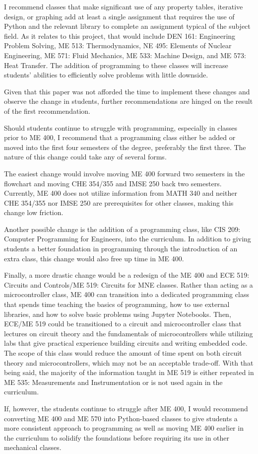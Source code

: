 I recommend classes that make significant use of any property tables, 
iterative design, or graphing add at least a single assignment that 
requires the use of Python and the relevant library to complete an assignment
typical of the subject field. As it relates to this project, that would include
DEN 161: Engineering Problem Solving, ME 513: Thermodynamics, NE 495: Elements 
of Nuclear Engineering, ME 571: Fluid Mechanics, ME 533: Machine Design, and 
ME 573: Heat Transfer. The addition of programming to these classes will 
increase students' abilities to efficiently solve problems with little downside. 

Given that this paper was not afforded the time to implement these changes
and observe the change in students, further recommendations are hinged on the
result of the first recommendation.

Should students continue to struggle with programming, especially in
classes prior to ME 400, I recommend that a programming class either be 
added or moved into the first four semesters of the degree, preferably 
the first three. The nature of this change could take any of several forms. 

The easiest change would involve moving ME 400 forward two semesters in the
flowchart and moving CHE 354/355 and IMSE 250 back two semesters. Currently,
ME 400 does not utilize information from MATH 340 and neither CHE 354/355 nor
IMSE 250 are prerequisites for other classes, making this change low friction. 

Another possible change is the addition of a programming class, like CIS 209: 
Computer Programming for Engineers, into the curriculum. In addition to 
giving students a better foundation in programming through the introduction
of an extra class, this change would also free up time in ME 400.

Finally, a more drastic change would be a redesign of the ME 400 and 
ECE 519: Circuits and Controls/ME 519: Circuits for MNE classes. Rather
than acting as a microcontroller class, ME 400 can transition into a dedicated
programming class that spends time teaching the basics of programming, how
to use external libraries, and how to solve basic problems using Jupyter
Notebooks. Then, ECE/ME 519 could be transitioned to a circuit and 
microcontroller class that lectures on circuit theory and the fundamentals
of microcontrollers while utilizing labs that give practical experience building
circuits and writing embedded code. The scope of this class would reduce
the amount of time spent on both circuit theory and microcontrollers, which
may not be an acceptable trade-off. With that being said, the majority
of the information taught in ME 519 is either repeated in ME 535:
Measurements and Instrumentation or is not used again in the curriculum.

If, however, the students continue to struggle after ME 400, I would 
recommend converting ME 400 and ME 570 into Python-based classes to give
students a more consistent approach to programming as well as moving 
ME 400 earlier in the curriculum to solidify the foundations before 
requiring its use in other mechanical classes.
